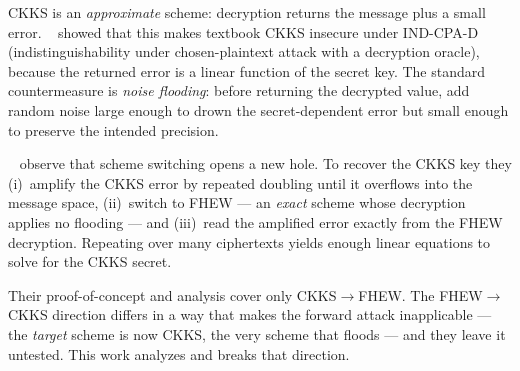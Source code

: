 \documentclass[11pt]{article}
\newcommand{\fto}{\texorpdfstring{FHEW$\to$CKKS}{FHEW-to-CKKS}}
\newcommand{\ctf}{\texorpdfstring{CKKS$\to$FHEW}{CKKS-to-FHEW}}
\begin{document}
CKKS is an \emph{approximate} scheme: decryption returns the message plus a small error.
\citeauthor{limicciancio2021}~\cite{limicciancio2021} showed that this makes textbook CKKS
insecure under IND-CPA-D (indistinguishability under chosen-plaintext attack with a decryption
oracle), because the returned error is a linear function of the secret key. The standard
countermeasure is \emph{noise flooding}: before returning the decrypted value, add random noise
large enough to drown the secret-dependent error but small enough to preserve the intended
precision.

\citeauthor{santato2026}~\cite{santato2026} observe that scheme switching opens a new hole. To
recover the CKKS key they (i)~amplify the CKKS error by repeated doubling until it overflows into
the message space, (ii)~switch to FHEW --- an \emph{exact} scheme whose decryption applies no
flooding --- and (iii)~read the amplified error exactly from the FHEW decryption. Repeating over
many ciphertexts yields enough linear equations to solve for the CKKS secret.

Their proof-of-concept and analysis cover only \ctf{}. The \fto{} direction differs
in a way that makes the forward attack inapplicable --- the \emph{target} scheme is now CKKS, the
very scheme that floods --- and they leave it untested. This work analyzes and breaks that
direction.
\end{document}
